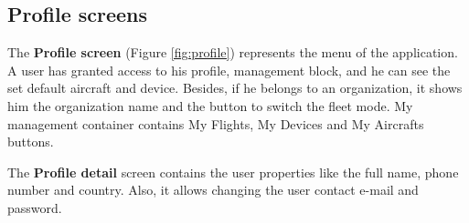 \subsection{Profile screens}\label{subsec:profile-screens}
The \textbf{Profile screen} (Figure \ref{fig:profile}) represents the menu of the application.
A user has granted access to his profile, management block, and he can see the set default aircraft and device.
Besides, if he belongs to an organization, it shows him the organization name and the button to switch the fleet mode.
My management container contains My Flights, My Devices and My Aircrafts buttons.

The \textbf{Profile detail} screen contains the user properties like the full name, phone number and country.
Also, it allows changing the user contact e-mail and password.


